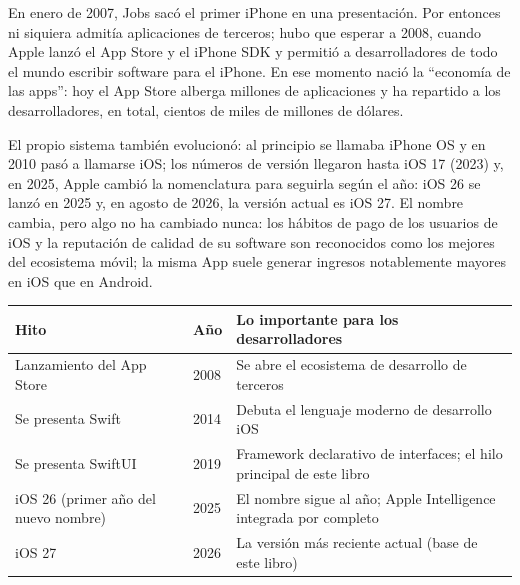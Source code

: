 


En enero de 2007, Jobs sacó el primer iPhone en una presentación. Por entonces ni siquiera admitía aplicaciones de terceros; hubo que esperar a 2008, cuando Apple lanzó el App Store y el iPhone SDK y permitió a desarrolladores de todo el mundo escribir software para el iPhone. En ese momento nació la “economía de las apps”: hoy el App Store alberga millones de aplicaciones y ha repartido a los desarrolladores, en total, cientos de miles de millones de dólares.

El propio sistema también evolucionó: al principio se llamaba iPhone OS y en 2010 pasó a llamarse iOS; los números de versión llegaron hasta iOS 17 (2023) y, en 2025, Apple cambió la nomenclatura para seguirla según el año: iOS 26 se lanzó en 2025 y, en agosto de 2026, la versión actual es iOS 27. El nombre cambia, pero algo no ha cambiado nunca: los hábitos de pago de los usuarios de iOS y la reputación de calidad de su software son reconocidos como los mejores del ecosistema móvil; la misma App suele generar ingresos notablemente mayores en iOS que en Android.

\begin{center}
\begin{tabularx}{\linewidth}{|X|X|X|}
\hline
\textbf{Hito} & \textbf{Año} & \textbf{Lo importante para los desarrolladores} \tabularnewline
\hline
Lanzamiento del App Store & 2008 & Se abre el ecosistema de desarrollo de terceros \tabularnewline
Se presenta Swift & 2014 & Debuta el lenguaje moderno de desarrollo iOS \tabularnewline
Se presenta SwiftUI & 2019 & Framework declarativo de interfaces; el hilo principal de este libro \tabularnewline
iOS 26 (primer año del nuevo nombre) & 2025 & El nombre sigue al año; Apple Intelligence integrada por completo \tabularnewline
iOS 27 & 2026 & La versión más reciente actual (base de este libro) \tabularnewline
\hline
\end{tabularx}
\end{center}

